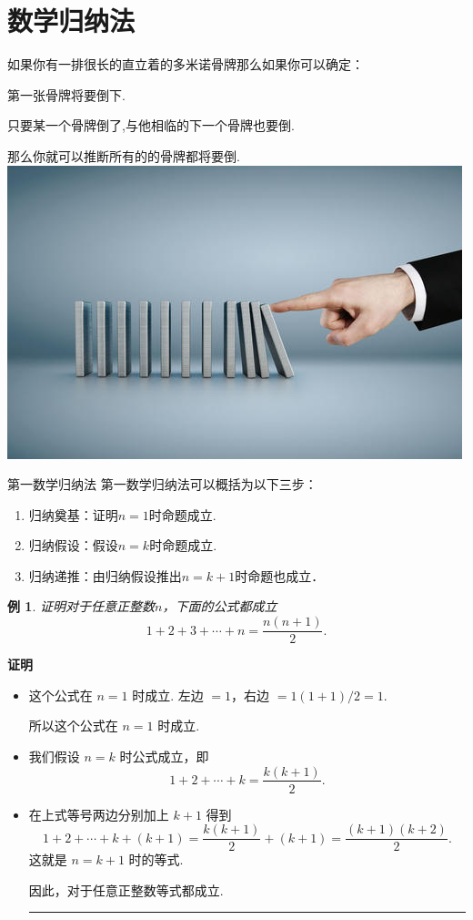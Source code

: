 \documentclass[13pt,fontset=mac]{ctexbeamer}
\newtheorem{exa}{例}
\def\qed{\nopagebreak\hfill{\rule{4pt}{7pt}}\medbreak}
\def\pf{{\bf 证明~~ }}
\begin{document}
\section{数学归纳法}

\begin{frame}


如果你有一排很长的直立着的多米诺骨牌那么如果你可以确定：

第一张骨牌将要倒下.

只要某一个骨牌倒了,与他相临的下一个骨牌也要倒.

那么你就可以推断所有的的骨牌都将要倒. \\[15pt]
		\includegraphics[scale=0.4]{gupai.jpg}
\end{frame}


\begin{frame}{第一数学归纳法}
第一数学归纳法可以概括为以下三步：
\begin{enumerate}

\item 归纳奠基：证明$n=1$时命题成立.
\item 归纳假设：假设$n=k$时命题成立.
\item 归纳递推：由归纳假设推出$n=k+1$时命题也成立．
\end{enumerate}
\end{frame}

\begin{frame}
\begin{exa}
证明对于任意正整数$n$，下面的公式都成立
\[
1+2+3+\cdots+n=\frac{n(n+1)}{2}.
\]
\end{exa}
\pause
\pf
\begin{itemize}
\item 这个公式在 $n=1$ 时成立.  左边 $= 1$，右边 $= 1(1+ 1) / 2 = 1$.

所以这个公式在 $n=1$ 时成立.
\item 我们假设 $n=k$ 时公式成立，即
\[
1+2+\cdots+k=\frac{k(k+1)}{2}.
\]
\item 在上式等号两边分别加上 $k+1$ 得到
\[
1+2+\cdots+k+(k+1)=\frac{k(k+1)}{2}+(k+1) = \frac{(k+1)(k+2)}{2}.
\]
这就是 $n=k+1$ 时的等式.

因此，对于任意正整数等式都成立. \qed
\end{itemize}
\end{frame}
\end{document}

